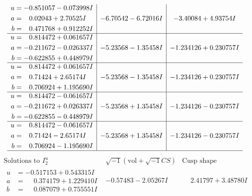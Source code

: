 \documentclass[1p]{elsarticle_modified}
\theoremstyle{definition}
\newcommand{\I}{\sqrt{-1}}
\begin{document}
$$\begin{array}{c|c|c}
\begin{aligned}
u &= -0.851057 - 0.073998 I \\
a &= \phantom{-}0.02043 + 2.70525 I \\
b &= \phantom{-}0.471768 + 0.912252 I\end{aligned}
 & -6.70542 - 6.72016 I & -3.40084 + 4.93754 I \\ \hline\begin{aligned}
u &= \phantom{-}0.814472 + 0.061657 I \\
a &= -0.211672 - 0.026337 I \\
b &= -0.622855 + 0.448979 I\end{aligned}
 & -5.23568 - 1.35458 I & -1.234126 + 0.230757 I \\ \hline\begin{aligned}
u &= \phantom{-}0.814472 + 0.061657 I \\
a &= \phantom{-}0.71424 + 2.65174 I \\
b &= \phantom{-}0.706924 + 1.195690 I\end{aligned}
 & -5.23568 - 1.35458 I & -1.234126 + 0.230757 I \\ \hline\begin{aligned}
u &= \phantom{-}0.814472 - 0.061657 I \\
a &= -0.211672 + 0.026337 I \\
b &= -0.622855 - 0.448979 I\end{aligned}
 & -5.23568 + 1.35458 I & -1.234126 - 0.230757 I \\ \hline\begin{aligned}
u &= \phantom{-}0.814472 - 0.061657 I \\
a &= \phantom{-}0.71424 - 2.65174 I \\
b &= \phantom{-}0.706924 - 1.195690 I\end{aligned}
 & -5.23568 + 1.35458 I & -1.234126 - 0.230757 I\\
 \hline 
 \end{array}$$\newpage$$\begin{array}{c|c|c}  
\text{Solutions to }I^u_{2}& \I (\text{vol} + \sqrt{-1}CS) & \text{Cusp shape}\\
 \hline 
\begin{aligned}
u &= -0.517153 + 0.543315 I \\
a &= \phantom{-}0.374179 + 1.229410 I \\
b &= \phantom{-}0.087079 + 0.755551 I\end{aligned}
 & -0.57483 - 2.05267 I & \phantom{-}2.41797 + 3.48780 I \\ \hline\begin{aligned}

\end{aligned}
\end{array}$$
\end{document}
